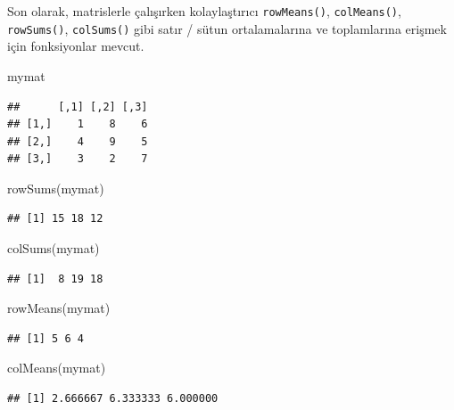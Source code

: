 \documentclass[
]{book}
\newenvironment{Shaded}{\begin{snugshade}}{\end{snugshade}}
\newcommand{\FunctionTok}[1]{\textcolor[rgb]{0.00,0.00,0.00}{#1}}
\newcommand{\NormalTok}[1]{#1}
\begin{document}
Son olarak, matrislerle çalışırken kolaylaştırıcı \texttt{rowMeans()}, \texttt{colMeans()}, \texttt{rowSums()}, \texttt{colSums()} gibi satır / sütun ortalamalarına ve toplamlarına erişmek için fonksiyonlar mevcut.

\begin{Shaded}
\begin{Highlighting}[]
\NormalTok{mymat}
\end{Highlighting}
\end{Shaded}

\begin{verbatim}
##      [,1] [,2] [,3]
## [1,]    1    8    6
## [2,]    4    9    5
## [3,]    3    2    7
\end{verbatim}

\begin{Shaded}
\begin{Highlighting}[]
\FunctionTok{rowSums}\NormalTok{(mymat)}
\end{Highlighting}
\end{Shaded}

\begin{verbatim}
## [1] 15 18 12
\end{verbatim}

\begin{Shaded}
\begin{Highlighting}[]
\FunctionTok{colSums}\NormalTok{(mymat)}
\end{Highlighting}
\end{Shaded}

\begin{verbatim}
## [1]  8 19 18
\end{verbatim}

\begin{Shaded}
\begin{Highlighting}[]
\FunctionTok{rowMeans}\NormalTok{(mymat)}
\end{Highlighting}
\end{Shaded}

\begin{verbatim}
## [1] 5 6 4
\end{verbatim}

\begin{Shaded}
\begin{Highlighting}[]
\FunctionTok{colMeans}\NormalTok{(mymat)}
\end{Highlighting}
\end{Shaded}

\begin{verbatim}
## [1] 2.666667 6.333333 6.000000
\end{verbatim}
\end{document}

